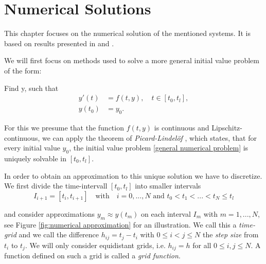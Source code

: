 \chapter{Numerical Solutions}
\label{sec:Numerical Solutions}

This chapter focuses on the numerical solution of the mentioned systems. It is based on results presented in \cite{NumerikGewöhnlicherDifferentialgleichungen} and \cite{HairerErnst1989Tnso}.

We will first focus on methods used to solve a more general initial value problem of the form:

Find y, such that
\begin{equation}
	\begin{aligned}
		y'(t) &= f(t,y), \quad t \in [t_0, t_l], \\
		y(t_0) &= y_0.
	\end{aligned}
	\label{general numerical problem}
\end{equation}

For this we presume that the function $f(t,y)$ is continuous and Lipschitz-continuous, we can apply the theorem of \emph{Picard-Lindelöf} , which states, that for every initial value $y_0$, the initial value problem \eqref{general numerical problem} is uniquely solvable in $[t_0, t_l]$.

In order to obtain an approximation to this unique solution we have to discretize. We first divide the time-intervall $[t_0, t_l]$ into smaller intervals
\begin{displaymath}
	I_{i+1} = [t_i, t_{i+1}] \quad \text{with} \quad i=0,...,N \text{ and } t_0 < t_1 < ... < t_N \leq t_l
\end{displaymath}

and consider approximations $y_m \approx y(t_m)$ on each interval $I_m$ with $m=1,...,N$, see Figure \ref{fig:numerical approximation} for an illustration. We call this a \emph{time-grid} and we call the difference $h_{ij} = t_j - t_i$ with $0 \leq i < j \leq N$ the \emph{step size} from $t_i$ to $t_j$. We will only consider equidistant grids, i.e. $h_{ij} = h$ for all $0 \leq i,j \leq N$. A function defined on such a grid is called a \emph{grid function}.


